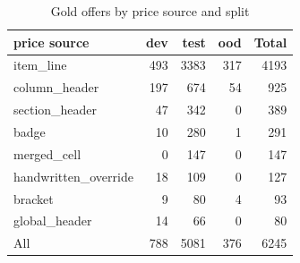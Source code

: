 \begin{table}[t]
\centering
\caption{Gold offers by price source and split}
\label{tab:pricesource}
\small
\begin{tabular}{lrrrr}
\toprule
price source & dev & test & ood & Total \\
\midrule
item\_line & 493 & 3383 & 317 & 4193 \\
column\_header & 197 & 674 & 54 & 925 \\
section\_header & 47 & 342 & 0 & 389 \\
badge & 10 & 280 & 1 & 291 \\
merged\_cell & 0 & 147 & 0 & 147 \\
handwritten\_override & 18 & 109 & 0 & 127 \\
bracket & 9 & 80 & 4 & 93 \\
global\_header & 14 & 66 & 0 & 80 \\
All & 788 & 5081 & 376 & 6245 \\
\bottomrule
\end{tabular}
\end{table}
